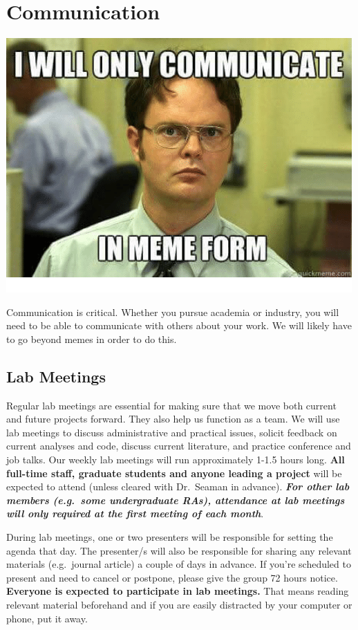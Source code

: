 \documentclass[]{book}
\begin{document}
\hypertarget{communication}{%
\chapter{Communication}\label{communication}}

\includegraphics{images/communication.png}

Communication is critical. Whether you pursue academia or industry, you will need to be able to communicate with others about your work. We will likely have to go beyond memes in order to do this.

\hypertarget{lab-meetings}{%
\section{Lab Meetings}\label{lab-meetings}}

Regular lab meetings are essential for making sure that we move both current and future projects forward. They also help us function as a team. We will use lab meetings to discuss administrative and practical issues, solicit feedback on current analyses and code, discuss current literature, and practice conference and job talks. Our weekly lab meetings will run approximately 1-1.5 hours long. \textbf{All full-time staff, graduate students and anyone leading a project} will be expected to attend (unless cleared with Dr.~Seaman in advance). \textbf{\emph{For other lab members (e.g.~some undergraduate RAs), attendance at lab meetings will only required at the first meeting of each month}}.

During lab meetings, one or two presenters will be responsible for setting the agenda that day. The presenter/s will also be responsible for sharing any relevant materials (e.g.~journal article) a couple of days in advance. If you're scheduled to present and need to cancel or postpone, please give the group 72 hours notice. \textbf{Everyone is expected to participate in lab meetings.} That means reading relevant material beforehand and if you are easily distracted by your computer or phone, put it away.
\end{document}

